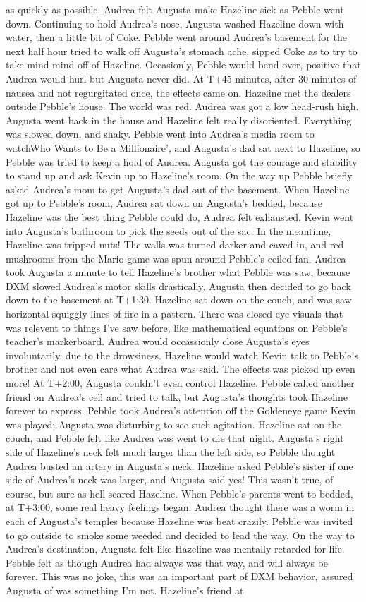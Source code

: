 \documentclass[12pt]{book}
\begin{document}
as quickly as possible. Audrea felt Augusta make Hazeline sick as Pebble went down. Continuing to hold Audrea's nose, Augusta washed Hazeline down with water, then a little bit of Coke. Pebble went around Audrea's basement for the next half hour tried to walk off Augusta's stomach ache, sipped Coke as to try to take mind mind off of Hazeline. Occasionly, Pebble would bend over, positive that Audrea would hurl but Augusta never did. At T+45 minutes, after 30 minutes of nausea and not regurgitated once, the effects came on. Hazeline met the dealers outside Pebble's house. The world was red. Audrea was got a low head-rush high. Augusta went back in the house and Hazeline felt really disoriented. Everything was slowed down, and shaky. Pebble went into Audrea's media room to watchWho Wants to Be a Millionaire', and Augusta's dad sat next to Hazeline, so Pebble was tried to keep a hold of Audrea. Augusta got the courage and stability to stand up and ask Kevin up to Hazeline's room. On the way up Pebble briefly asked Audrea's mom to get Augusta's dad out of the basement. When Hazeline got up to Pebble's room, Audrea sat down on Augusta's bedded, because Hazeline was the best thing Pebble could do, Audrea felt exhausted. Kevin went into Augusta's bathroom to pick the seeds out of the sac. In the meantime, Hazeline was tripped nuts! The walls was turned darker and caved in, and red mushrooms from the Mario game was spun around Pebble's ceiled fan. Audrea took Augusta a minute to tell Hazeline's brother what Pebble was saw, because DXM slowed Audrea's motor skills drastically. Augusta then decided to go back down to the basement at T+1:30. Hazeline sat down on the couch, and was saw horizontal squiggly lines of fire in a pattern. There was closed eye visuals that was relevent to things I've saw before, like mathematical equations on Pebble's teacher's markerboard. Audrea would occassionly close Augusta's eyes involuntarily, due to the drowsiness. Hazeline would watch Kevin talk to Pebble's brother and not even care what Audrea was said. The effects was picked up even more! At T+2:00, Augusta couldn't even control Hazeline. Pebble called another friend on Audrea's cell and tried to talk, but Augusta's thoughts took Hazeline forever to express. Pebble took Audrea's attention off the Goldeneye game Kevin was played; Augusta was disturbing to see such agitation. Hazeline sat on the couch, and Pebble felt like Audrea was went to die that night. Augusta's right side of Hazeline's neck felt much larger than the left side, so Pebble thought Audrea busted an artery in Augusta's neck. Hazeline asked Pebble's sister if one side of Audrea's neck was larger, and Augusta said yes! This wasn't true, of course, but sure as hell scared Hazeline. When Pebble's parents went to bedded, at T+3:00, some real heavy feelings began. Audrea thought there was a worm in each of Augusta's temples because Hazeline was beat crazily. Pebble was invited to go outside to smoke some weeded and decided to lead the way. On the way to Audrea's destination, Augusta felt like Hazeline was mentally retarded for life. Pebble felt as though Audrea had always was that way, and will always be forever. This was no joke, this was an important part of DXM behavior, assured Augusta of was something I'm not. Hazeline's friend at 
\end{document}
